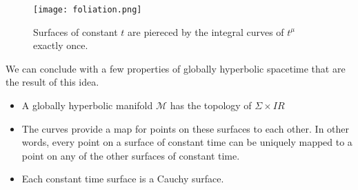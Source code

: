 \documentclass[10pt]{article}
\newcommand{\reals}{I\!\!R}
\begin{document}
            \begin{figure}[!h]
                \centering
                \texttt{[image: foliation.png]}
                \caption{Surfaces of constant $t$ are piereced by the integral curves of $t^\mu$ exactly once.}
                \label{fig:my_label}
            \end{figure}
            
            We can conclude with a few properties of globally hyperbolic spacetime that are the result of this idea.
            \begin{itemize}
                \item A globally hyperbolic manifold $\mathcal{M}$ has the topology of $\Sigma\times\reals$
                \item The curves provide a map for points on these surfaces to each other. In other words, every point on a surface of constant time can be uniquely mapped to a point on any of the other surfaces of constant time.
                \item Each constant time surface is a Cauchy surface.
            \end{itemize}
\end{document}
